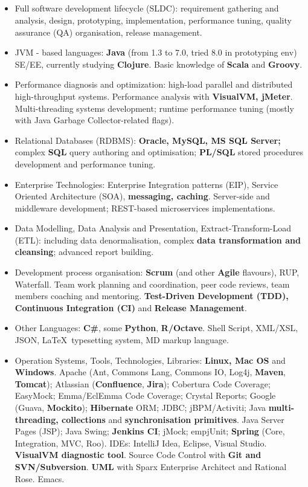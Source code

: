 \documentclass{res}
\newcommand{\osection}[1]{\section{\sc {\Large \textbf{#1}\\}} \vspace{0.30cm}}
\newcommand{\profileItem}[2]{\item {\sc #1:} #2.}
\newcommand{\emp}[1]{{\bf#1}}
\newif\ifFullVersion
\begin{document}
\begin{resume}
\osection{Technical Profile}
\vspace{0.20cm}
\begin{itemize}
  \profileItem {Full software development lifecycle (SLDC)} {requirement gathering and analysis, design, prototyping, implementation, performance tuning, quality assurance (QA) organisation, release management}
\ifFullVersion
  \profileItem {Development process organisation} {\emp{Scrum} (and other \emp{Agile} flavours), RUP, Waterfall. Team work planning and coordination, peer code reviews, team members coaching and mentoring. \emp{Continuous Integration (CI)} and \emp{Release Management}}
\fi
  \profileItem {JVM - based languages} {\emp{Java} (from 1.3 to 7.0, tried 8.0 in prototyping env) SE/EE, currently studying \emp{Clojure}. Basic knowledge of \emp{Scala} and \emp{Groovy}}
  \profileItem{Performance diagnosis and optimization} {high-load parallel and distributed high-throughput systems. Performance analysis with \emp{VisualVM, jMeter}. Multi-threading systems development; runtime performance tuning (mostly with Java Garbage Collector-related flags)}
  \profileItem {Relational Databases (RDBMS)} {\emp{Oracle, MySQL, MS SQL Server;} complex \emp{SQL} query authoring and optimisation; \emp{PL/SQL} stored procedures development and performance tuning}
  \profileItem{Enterprise Technologies} {Enterprise Integration patterns (EIP), Service Oriented Architecture (SOA), \emp{messaging, caching}. Server-side and middleware development; REST-based microservices implementations}
  \profileItem{Data Modelling, Data Analysis and Presentation, Extract-Transform-Load (ETL)} {including data denormalisation, complex \emp{data transformation and cleansing}; advanced report building}
\ifFullVersion
Strong interest in \emp{functional programming}, Data Science and Machine Learning / Business Intelligence systems.
\else
  \profileItem{Development process organisation} {\emp{Scrum} (and other \emp{Agile} flavours), RUP, Waterfall. Team work planning and coordination, peer code reviews, team members coaching and mentoring. \emp{Test-Driven Development (TDD), Continuous Integration (CI)} and \emp{Release Management}}
\fi
  \profileItem{Other Languages} {\emp{C\#}, some \emp{Python}, \emp{R/Octave}. Shell Script, XML/XSL, JSON, \LaTeX ~typesetting system, MD markup language}
  \profileItem{Operation Systems, Tools, Technologies, Libraries} {\emp{Linux, Mac OS} and \emp{Windows}. Apache (Ant, Commons Lang, Commons IO, Log4j, \emp{Maven}, \emp{Tomcat}); Atlassian (\emp{Confluence}, \emp{Jira}); Cobertura Code Coverage; EasyMock; Emma/EclEmma Code Coverage; Crystal Reports; Google (Guava, \emp{Mockito}); \emp{Hibernate} ORM; JDBC; jBPM/Activiti; Java \emp{multi-threading, collections} and \emp{synchronisation primitives}. Java Server Pages (JSP); Java Swing; \emp{Jenkins CI}; jMock; emp{jUnit}; \emp{Spring} (Core, Integration, MVC, Roo). IDEs: IntelliJ Idea, Eclipse, Visual Studio. \emp{VisualVM diagnostic tool}. Source Code Control with \emp{Git and SVN/Subversion}. \emp{UML} with Sparx Enterprise Architect and Rational Rose. Emacs}


\end{itemize}
\end{resume}
\end{document}
